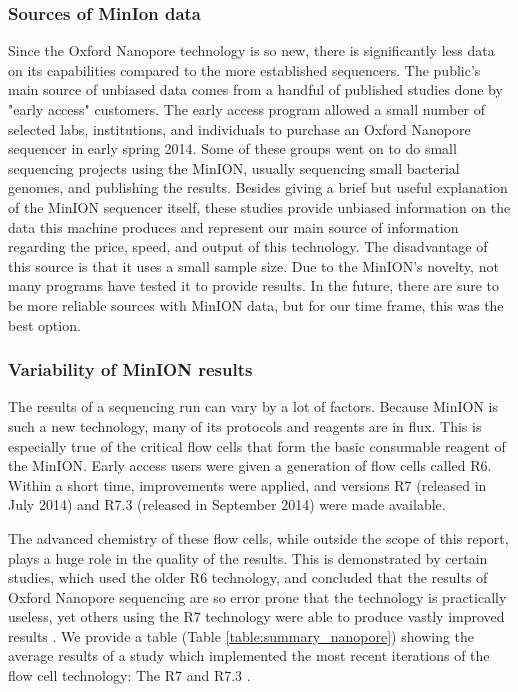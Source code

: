 \documentclass[12pt,letterpaper]{report}
\begin{document}
\subsubsection{Sources of MinIon data}

Since the Oxford Nanopore technology is so new, there is significantly less data on its capabilities compared to the more established sequencers. The public's main source of unbiased data comes from a handful of published studies done by "early access" customers. The early access program allowed a small number of selected labs, institutions, and individuals to purchase an Oxford Nanopore sequencer in early spring 2014. Some of these groups went on to do small sequencing projects using the MinION, usually sequencing small bacterial genomes, and publishing the results. Besides giving a brief but useful explanation of the MinION sequencer itself, these studies provide unbiased information on the data this machine produces and represent our main source of information regarding the price, speed, and output of this technology. The disadvantage of this source is that it uses a small sample size. Due to the MinION's novelty, not many programs have tested it to provide results. In the future, there are sure to be more reliable sources with MinION data, but for our time frame, this was the best option. 

\subsubsection{Variability of MinION results}

The results of a sequencing run can vary by a lot of factors. Because MinION is such a new technology, many of its protocols and reagents are in flux. This is especially true of the critical flow cells that form the basic consumable reagent of the MinION. Early access users were given a generation of flow cells called R6. Within a short time, improvements were applied, and versions R7 (released in July 2014) and R7.3 (released in September 2014) were made available. 

The advanced chemistry of these flow cells, while outside the scope of this report, plays a huge role in the quality of the results. This is demonstrated by certain studies, which used the older R6 technology, and concluded that the results of Oxford Nanopore sequencing are so error prone that the technology is practically useless, yet others using the R7 technology were able to produce vastly improved results \cite{Mikheyev}. We provide a table (Table \ref{table:summary_nanopore}) showing the average results of a study which implemented the most recent iterations of the flow cell technology: The R7 and R7.3 \cite{Quick}.
\end{document}
